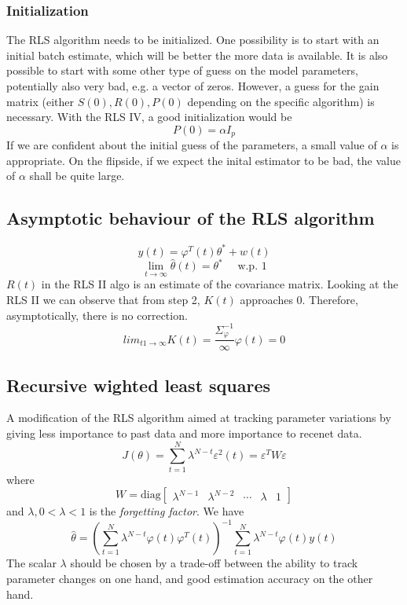 \documentclass{book}
\begin{document}
\subsubsection{Initialization}
The RLS algorithm needs to be initialized. One possibility is to start with an initial batch estimate, which will be better the more data is available. It is also possible to start with some other type of guess on the model parameters, potentially also very bad, e.g. a vector of zeros. However, a guess for the gain matrix (either $S(0), R(0), P(0)$ depending on the specific algorithm) is necessary. With the RLS IV, a good initialization would be
\[
    P(0)=\alpha I_p
\]
If we are confident about the initial guess of the parameters, a small value of $\alpha$ is appropriate. On the flipside, if we expect the inital estimator to be bad, the value of $\alpha$ shall be quite large.
\subsection{Asymptotic behaviour of the RLS algorithm}

\[
    y(t)=\varphi^T(t)\theta^*+w(t)
\]
\[
    \lim_{t\to\infty}\hat{\theta}(t)=\theta^* \quad \text{ w.p. 1}
\]
$R(t)$ in the RLS II algo is an estimate of the covariance matrix. Looking at the RLS II we can observe that from step 2, $K(t)$ approaches 0. Therefore, asymptotically, there is no correction.
\[
    lim_{t1\to\infty} K(t) = \frac{\Sigma^{-1}_{\varphi}}{\infty}\varphi(t) = 0
\]






\subsection{Recursive wighted least squares}
A modification of the RLS algorithm aimed at tracking  parameter variations by giving less importance to past data and more importance to recenet data.
\[
    J(\theta)=\sum_{t=1}^{N}\lambda^{N-t}\varepsilon^2(t)=\varepsilon^TW\varepsilon
\]
where
\[
    W=\text{diag}\begin{bmatrix} \lambda^{N-1} & \lambda^{N-2} & \cdots & \lambda & 1 \end{bmatrix}    
\]
and $\lambda, 0<\lambda<1$ is the \emph{forgetting factor}. We have
\[
    \hat{\theta} = \left( \sum_{t=1}^{N}\lambda^{N-t}\varphi(t)\varphi^T(t) \right)^{-1}\sum_{t=1}^{N}\lambda^{N-t}\varphi(t)y(t)
\]
The scalar $\lambda$ should be chosen by a trade-off between the ability to track parameter changes on one hand, and good estimation accuracy on the other hand.
\end{document}
